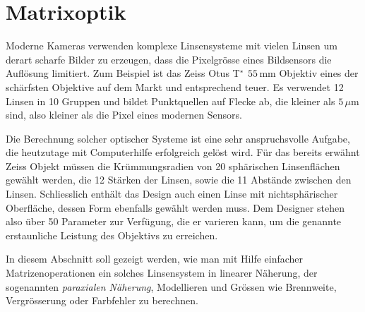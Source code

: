 %
%
%
\section{Matrixoptik
\label{section:matrixoptik}}
Moderne Kameras verwenden komplexe Linsensysteme mit vielen Linsen
um derart scharfe Bilder zu erzeugen, dass die Pixelgrösse eines
Bildsensors die Auflösung limitiert.
Zum Beispiel ist das Zeiss Otus T$\mathstrut^*$ $55\,\text{mm}$ Objektiv 
eines der schärfsten Objektive auf dem Markt und entsprechend teuer.
Es verwendet 12 Linsen in 10 Gruppen und bildet Punktquellen auf 
Flecke ab, die kleiner als $5\,\mu\text{m}$ sind, also kleiner als
die Pixel eines modernen Sensors.

Die Berechnung solcher optischer Systeme ist eine sehr anspruchsvolle
Aufgabe, die heutzutage mit Computerhilfe erfolgreich gelöst wird.
Für das bereits erwähnt Zeiss Objekt müssen die Krümmungsradien von 20
sphärischen Linsenflächen gewählt werden, die 12 Stärken der Linsen,
sowie die 11 Abstände zwischen den Linsen.
Schliesslich enthält das Design auch einen Linse mit nichtsphärischer
Oberfläche, dessen Form ebenfalls gewählt werden muss.
Dem Designer stehen also über 50 Parameter zur Verfügung, die er
varieren kann, um die genannte erstaunliche Leistung des Objektivs
zu erreichen.

In diesem Abschnitt soll gezeigt werden, wie man mit Hilfe einfacher
Matrizenoperationen ein solches Linsensystem in linearer Näherung,
der sogenannten {\em paraxialen Näherung}, Modellieren und Grössen
wie Brennweite, Vergrösserung oder Farbfehler zu berechnen.










